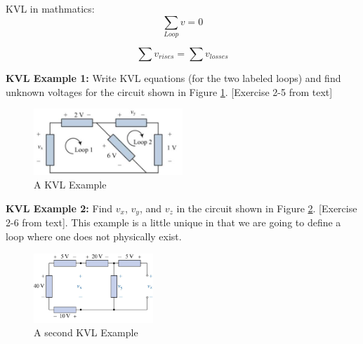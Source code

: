 \documentclass{handout}
\begin{document}
KVL in mathmatics:
\begin{equation}
\sum_{Loop} v = 0
\end{equation}

\begin{equation}
\sum v_{rises} = \sum v_{losses}
\end{equation}

\textbf{KVL Example 1:} Write KVL equations (for the two labeled loops) and find unknown voltages for the circuit shown in Figure \ref{fig: KVL_Example_1}.  [Exercise 2-5 from text]

\begin{figure}[h b t]
\centering
\includegraphics[width=0.5\textwidth]{KVL_Example_1.jpg}
\caption{A KVL Example}
\label{fig: KVL_Example_1}
\end{figure}


\newpage
\pagebreak
\clearpage

\textbf{KVL Example 2:} Find $v_x$, $v_y$, and $v_z$ in the circuit shown in Figure \ref{fig: KVL_Example_2}. [Exercise 2-6 from text]. This example is a little unique in that we are going to define a loop where one does not physically exist.

\begin{figure}[h b t]
\centering
\includegraphics[width=0.4\textwidth]{KVL_Example_2_unlabeled_loops.jpg}
\caption{A second KVL Example}
\label{fig: KVL_Example_2}
\end{figure}
\end{document}
